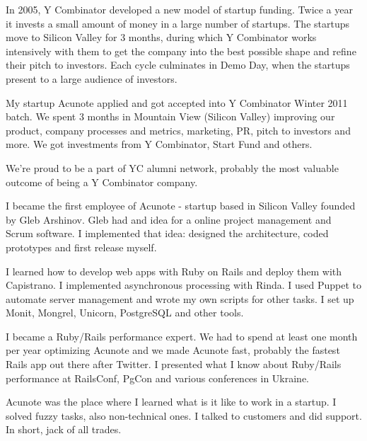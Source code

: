 \documentclass[12pt]{letter}
\begin{document}
\begin{llist}
           \item In 2005, Y Combinator developed a new model of startup funding. Twice a year it invests a small amount of money in a large number of startups. The startups move to Silicon Valley for 3 months, during which Y Combinator works intensively with them to get the company into the best possible shape and refine their pitch to investors. Each cycle culminates in Demo Day, when the startups present to a large audience of investors. 

           \item My startup Acunote applied and got accepted into Y Combinator Winter 2011 batch. We spent 3 months in Mountain View (Silicon Valley) improving our product, company processes and metrics, marketing, PR, pitch to investors and more. We got investments from Y Combinator, Start Fund and others.

           \item We're proud to be a part of YC alumni network, probably the most valuable outcome of being a Y Combinator company.

  \endexperience


  \startexperience

           \item I became the first employee of Acunote - startup based in Silicon Valley founded by Gleb Arshinov. Gleb had and idea for a online project management and Scrum software. I implemented that idea: designed the architecture, coded prototypes and first release myself.

           \item I learned how to develop web apps with Ruby on Rails and deploy them with Capistrano. I implemented asynchronous processing with Rinda. I used Puppet to automate server management and wrote my own scripts for other tasks. I set up Monit, Mongrel, Unicorn, PostgreSQL and other tools.

           \item I became a Ruby/Rails performance expert. We had to spend at least one month per year optimizing Acunote and we made Acunote fast, probably the fastest Rails app out there after Twitter. I presented what I know about Ruby/Rails performance at RailsConf, PgCon and various conferences in Ukraine.

           \item Acunote was the place where I learned what is it like to work in a startup. I solved fuzzy tasks, also non-technical ones. I talked to customers and did support. In short, jack of all trades.


\end{llist}
\end{document}
